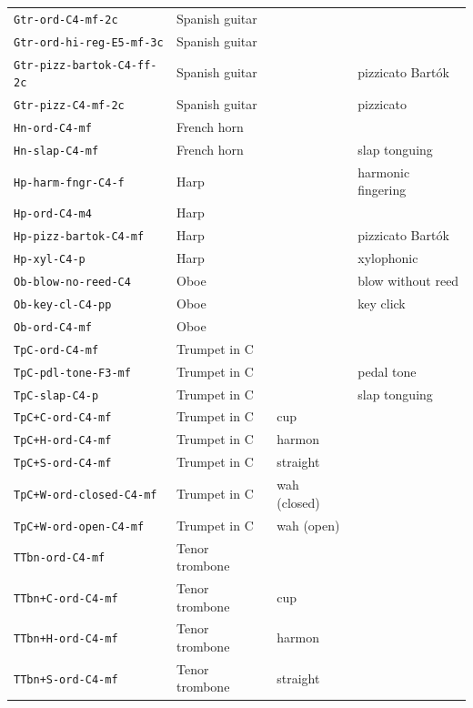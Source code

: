 \documentclass{bmcart}
\begin{document}
\begin{backmatter}
\begin{table}
\begin{tabular}{llll}
        \texttt{Gtr-ord-C4-mf-2c} & Spanish guitar & & \\
        \texttt{Gtr-ord-hi-reg-E5-mf-3c} & Spanish guitar & & \\
        \texttt{Gtr-pizz-bartok-C4-ff-2c} & Spanish guitar & & pizzicato Bart\'ok\\
        \texttt{Gtr-pizz-C4-mf-2c} & Spanish guitar &  & pizzicato \\ \hline
        \texttt{Hn-ord-C4-mf} & French horn & & \\
        \texttt{Hn-slap-C4-mf} & French horn & & slap tonguing \\ \hline
        \texttt{Hp-harm-fngr-C4-f} & Harp & & harmonic fingering \\
        \texttt{Hp-ord-C4-m4} & Harp & & \\
        \texttt{Hp-pizz-bartok-C4-mf} & Harp & & pizzicato Bart\'ok \\
        \texttt{Hp-xyl-C4-p} & Harp & & xylophonic \\ \hline
        \texttt{Ob-blow-no-reed-C4} & Oboe & & blow without reed \\
        \texttt{Ob-key-cl-C4-pp} & Oboe & & key click \\
        \texttt{Ob-ord-C4-mf} & Oboe & & \\ \hline
        \texttt{TpC-ord-C4-mf} & Trumpet in C & & \\
        \texttt{TpC-pdl-tone-F3-mf} & Trumpet in C & & pedal tone \\
        \texttt{TpC-slap-C4-p} & Trumpet in C & & slap tonguing \\
        \texttt{TpC+C-ord-C4-mf} & Trumpet in C & cup & \\
        \texttt{TpC+H-ord-C4-mf} & Trumpet in C & harmon & \\
        \texttt{TpC+S-ord-C4-mf} & Trumpet in C & straight & \\
        \texttt{TpC+W-ord-closed-C4-mf} & Trumpet in C & wah (closed) & \\
        \texttt{TpC+W-ord-open-C4-mf} & Trumpet in C & wah (open) & \\ \hline
        \texttt{TTbn-ord-C4-mf} & Tenor trombone & &  \\
        \texttt{TTbn+C-ord-C4-mf} & Tenor trombone & cup & \\
        \texttt{TTbn+H-ord-C4-mf} & Tenor trombone & harmon & \\
        \texttt{TTbn+S-ord-C4-mf} & Tenor trombone & straight & \\

\end{tabular}
\end{table}
\end{backmatter}
\end{document}
